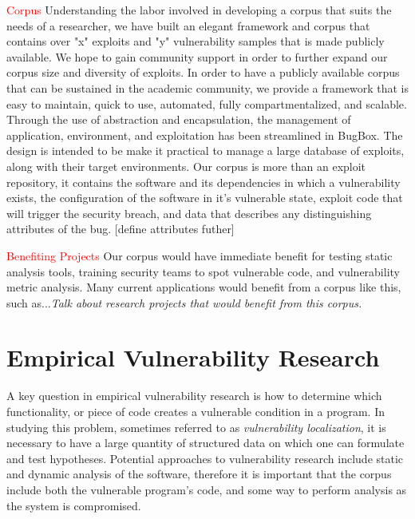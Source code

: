 \documentclass[letterpaper,twocolumn,10pt]{article}
\begin{document}
\textcolor{red}{Corpus}
Understanding the labor involved in developing a corpus that suits the needs of a researcher, we have built an elegant framework and corpus that contains over "x" exploits and "y" vulnerability samples that is made publicly available.  We hope to gain community support in order to further expand our corpus size and diversity of exploits.  In order to have a publicly available corpus that can be sustained in the academic community, we provide a framework that is easy to maintain, quick to use, automated, fully compartmentalized, and scalable.  Through the use of abstraction and encapsulation, the management of application, environment, and exploitation has been streamlined in BugBox.  The design is intended to be make it practical to manage a large database of exploits, along with their target environments. Our corpus is more than an exploit repository, it contains the software and its dependencies in which a vulnerability exists, the configuration of the software in it's vulnerable state, exploit code that will trigger the security breach, and data that describes any distinguishing attributes of the bug. [define attributes futher]\par

\textcolor{red}{Benefiting Projects}
Our corpus would have immediate benefit for testing static analysis tools\endnote{}, training security teams to spot vulnerable code\endnote{}, and vulnerability metric analysis.
Many current applications would benefit from a corpus like this, such as...{\em Talk about research projects that would benefit from this corpus.}

\section{Empirical Vulnerability Research}

A key question in empirical vulnerability research is how to determine which functionality, or piece of code creates a vulnerable condition in a program. In studying this problem, sometimes referred to as \emph{vulnerability localization}, it is necessary to have a large quantity of structured data on which one can formulate and test hypotheses. Potential approaches to vulnerability research include static and dynamic analysis of the software, therefore it is important that the corpus include both the vulnerable program's code, and some way to perform analysis as the system is compromised.\\
\end{document}
